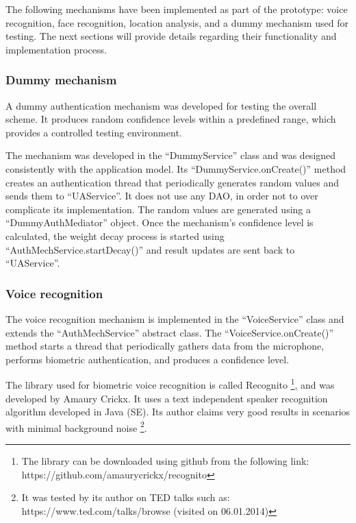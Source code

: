 The following mechanisms have been implemented as part of the prototype: voice recognition, face recognition, location analysis, and a dummy mechanism used for testing. The next sections will provide details regarding their functionality and implementation process.

\subsubsection{Dummy mechanism}
A dummy authentication mechanism was developed for testing the overall scheme. It produces random confidence levels within a predefined range, which provides a controlled testing environment.

The mechanism was developed in the ``DummyService'' class and was designed consistently with the application model. Its ``DummyService.onCreate()'' method creates an authentication thread that periodically generates random values and sends them to ``UAService''. It does not use any DAO, in order not to over complicate its implementation. The random values are generated using a ``DummyAuthMediator'' object. Once the mechanism's confidence level is calculated, the weight decay process is started using ``AuthMechService.startDecay()'' and result updates are sent back to ``UAService''.

\subsubsection{Voice recognition}
The voice recognition mechanism is implemented in the ``VoiceService'' class and extends the ``AuthMechService'' abstract class. The ``VoiceService.onCreate()'' method starts a thread that periodically gathers data from the microphone, performs biometric authentication, and produces a confidence level.

The library used for biometric voice recognition is called Recognito \footnote{The library can be downloaded using github from the following link: https://github.com/amaurycrickx/recognito}, and was developed by Amaury Crickx. It uses a text independent speaker recognition algorithm developed in Java (SE). Its author claims very good results in scenarios with minimal background noise \footnote{It was tested by its author on TED talks such as:  https://www.ted.com/talks/browse (visited on 06.01.2014)}.


